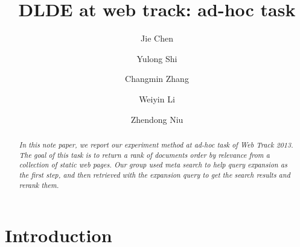 \documentclass[runningheads,a4paper]{llncs}
\begin{document}
\mainmatter  %

\title{DLDE at web track: ad-hoc task}


%
%
\author{Jie Chen \and Yulong Shi \and Changmin Zhang \and Weiyin Li \and Zhendong Niu}

%


%
%

\maketitle

\begin{abstract}
\emph{In this note paper, we report our experiment method at ad-hoc task of Web Track 2013. The goal of this task is to return a rank of documents order by relevance from a collection of static web pages. Our group used meta search to help query expansion as the first step, and then retrieved with the expansion query to get the search results and rerank them. }
\end{abstract}

\section{Introduction}
\end{document}
